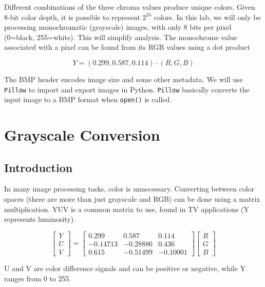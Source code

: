 \documentclass[11pt,a4paper]{article}
\begin{document}
Different combinations of the three chroma values produce unique colors. Given 8-bit color depth, it is possible to represent $2^{24}$ colors.
In this lab, we will only be processing monochromatic (grayscale) images, with only 8 bits per pixel (0=black, 255=white). This will simplify analysis. The monochrome value associated with a pixel can be found from its RGB values using a dot product

\begin{equation} \label{eq:Y}
Y = (0.299,0.587,0.114)\cdot(R,G,B)
\end{equation}

The BMP header encodes image size and some other metadata. We will use \verb|Pillow| to import and export images in Python. \verb|Pillow| basically converts the input image to a BMP format when \verb|open()| is called.

\pagebreak

\section{Grayscale Conversion}
\subsection{Introduction} 
In many image processing tasks, color is unnecessary. Converting between color spaces (there are more than just grayscale and RGB) can be done using a matrix multiplication. YUV is a common matrix to use, found in TV applications (Y represents luminosity).

\begin{equation}\label{eq:YUV}
     \begin{bmatrix}
       Y \\
       U \\
       V
     \end{bmatrix}
     =
     \begin{bmatrix}
       0.299 & 0.587 & 0.114 \\
       -0.14713 & -0.28886 & 0.436 \\
       0.615 & -0.51499 & -0.10001
     \end{bmatrix}
     \begin{bmatrix}
       R \\
       G \\
       B
     \end{bmatrix}
\end{equation}

U and V are color difference signals and can be positive or negative, while Y ranges from 0 to 255.
\end{document}
